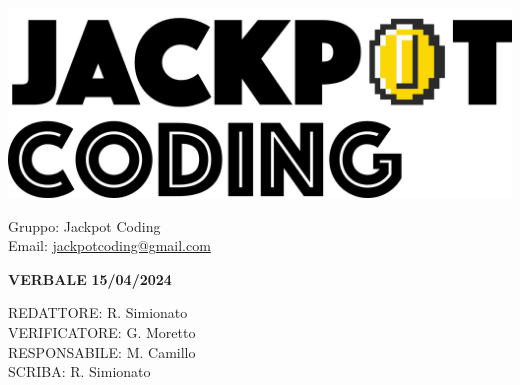 \documentclass[5pt]{article}
\begin{document}
\begin{minipage}[t]{0.50\textwidth}
    \begin{flushleft}
        \hspace{10pt}
        \includegraphics[scale=0.65]{jackpot-logo.png} 
    \end{flushleft}
\end{minipage}
\hspace{-60pt} %
\begin{flushright}
    \begin{minipage}[t]{0.50\textwidth}
        \begin{flushright}
            Gruppo: {\Large Jackpot Coding}\\
            Email: \href{mailto:jackpotcoding@gmail.com}{jackpotcoding@gmail.com}
        \end{flushright}
    \end{minipage}
\end{flushright}

\vspace{24pt}

\begin{center}
    \textbf{\large VERBALE }
    \textbf{\large 15/04/2024} \\
\end{center}

\vspace{13pt}

\begin{flushleft}
    \begin{spacing}{1.5}
        REDATTORE:  R. Simionato\\%
        VERIFICATORE:   G. Moretto\\%
        RESPONSABILE:  M. Camillo\\%
        \vspace{7pt}
        SCRIBA: R. Simionato\\%
        \vspace{7pt}
    \end{spacing}
\end{flushleft}
\end{document}
